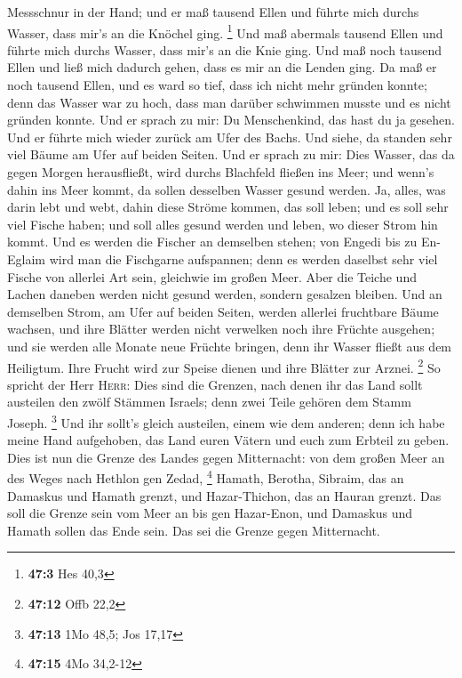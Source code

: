 Messschnur in der Hand; und er maß tausend Ellen und führte mich durchs
Wasser, dass mir's an die Knöchel ging. \footnote{\textbf{47:3} Hes 40,3}
 Und maß abermals tausend Ellen und führte mich durchs
Wasser, dass mir's an die Knie ging. Und maß noch tausend Ellen und ließ
mich dadurch gehen, dass es mir an die Lenden ging.  Da
maß er noch tausend Ellen, und es ward so tief, dass ich nicht mehr
gründen konnte; denn das Wasser war zu hoch, dass man darüber schwimmen
musste und es nicht gründen konnte.  Und er sprach zu mir:
Du Menschenkind, das hast du ja gesehen. Und er führte mich wieder
zurück am Ufer des Bachs.  Und siehe, da standen sehr viel
Bäume am Ufer auf beiden Seiten.  Und er sprach zu mir:
Dies Wasser, das da gegen Morgen herausfließt, wird durchs Blachfeld
fließen ins Meer; und wenn's dahin ins Meer kommt, da sollen desselben
Wasser gesund werden.  Ja, alles, was darin lebt und webt,
dahin diese Ströme kommen, das soll leben; und es soll sehr viel Fische
haben; und soll alles gesund werden und leben, wo dieser Strom hin
kommt.  Und es werden die Fischer an demselben stehen;
von Engedi bis zu En-Eglaim wird man die Fischgarne aufspannen; denn es
werden daselbst sehr viel Fische von allerlei Art sein, gleichwie im
großen Meer.  Aber die Teiche und Lachen daneben werden
nicht gesund werden, sondern gesalzen bleiben.  Und an
demselben Strom, am Ufer auf beiden Seiten, werden allerlei fruchtbare
Bäume wachsen, und ihre Blätter werden nicht verwelken noch ihre Früchte
ausgehen; und sie werden alle Monate neue Früchte bringen, denn ihr
Wasser fließt aus dem Heiligtum. Ihre Frucht wird zur Speise dienen und
ihre Blätter zur Arznei. \footnote{\textbf{47:12} Offb 22,2}
 So spricht der Herr \textsc{Herr}: Dies sind die
Grenzen, nach denen ihr das Land sollt austeilen den zwölf Stämmen
Israels; denn zwei Teile gehören dem Stamm Joseph. \footnote{\textbf{47:13}
  1Mo 48,5; Jos 17,17}  Und ihr sollt's gleich austeilen,
einem wie dem anderen; denn ich habe meine Hand aufgehoben, das Land
euren Vätern und euch zum Erbteil zu geben.  Dies ist nun
die Grenze des Landes gegen Mitternacht: von dem großen Meer an des
Weges nach Hethlon gen Zedad, \footnote{\textbf{47:15} 4Mo 34,2-12}
 Hamath, Berotha, Sibraim, das an Damaskus und Hamath
grenzt, und Hazar-Thichon, das an Hauran grenzt.  Das
soll die Grenze sein vom Meer an bis gen Hazar-Enon, und Damaskus und
Hamath sollen das Ende sein. Das sei die Grenze gegen Mitternacht.

